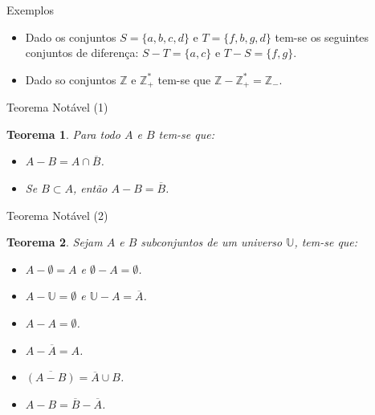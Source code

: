 \documentclass[aspectratio=169]{beamer}
\newtheorem{teo}{Teorema}
\begin{document}
	\begin{frame}{Exemplos}
		\begin{itemize}
			\item Dado os conjuntos $S = \{a, b, c, d\}$ e $T = \{f, b, g, d\}$ tem-se os seguintes conjuntos de diferença: $S - T = \{a, c\}$ e $T - S = \{f, g\}$.
			\item Dado so conjuntos $\mathbb{Z}$ e $\mathbb{Z}_+^*$ tem-se que $\mathbb{Z} - \mathbb{Z}_+^* = \mathbb{Z}_-$.
		\end{itemize}
	\end{frame}


	\begin{frame}{Teorema Notável (1)}
		\begin{teo}
			Para todo $A$ e $B$ tem-se que:
			\begin{itemize}
				\item[i.] $A - B = A \cap \overline{B}$.
				\item[ii.] Se $B \subset A$, então $A - B = \overline{B}$.
			\end{itemize}
		\end{teo}
	\end{frame}

	\begin{frame}{Teorema Notável (2)}
		\begin{teo}
			Sejam $A$ e $B$ subconjuntos de um universo $\mathbb{U}$, tem-se que:
			\begin{itemize}
				\item[a.] $A - \emptyset = A$ e $\emptyset - A = \emptyset$.
				\item[b.] $A - \mathbb{U} = \emptyset$ e $\mathbb{U} - A = \overline{A}$.
				\item[c.] $A - A = \emptyset$.
				\item[d.] $A - \overline{A} = A$.
				\item[e.] $\overline{(A - B)} = \overline{A} \cup B$.
				\item[f.] $A - B = \overline{B} - \overline{A}$.
			\end{itemize}
		\end{teo}
	\end{frame}
\end{document}

